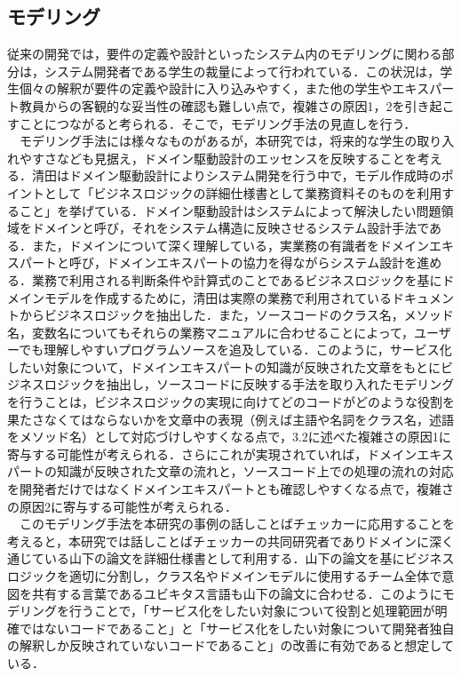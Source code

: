 \documentclass[12pt, a4paper]{jreport}
\begin{document}
\subsection{モデリング}
従来の開発では，要件の定義や設計といったシステム内のモデリングに関わる部分は，システム開発者である学生の裁量によって行われている．この状況は，学生個々の解釈が要件の定義や設計に入り込みやすく，また他の学生やエキスパート教員からの客観的な妥当性の確認も難しい点で，複雑さの原因1，2を引き起こすことにつながると考られる．そこで，モデリング手法の見直しを行う．
\\　モデリング手法には様々なものがあるが，本研究では，将来的な学生の取り入れやすさなども見据え，ドメイン駆動設計のエッセンスを反映することを考える．清田\cite{Domein}はドメイン駆動設計によりシステム開発を行う中で，モデル作成時のポイントとして「ビジネスロジックの詳細仕様書として業務資料そのものを利用すること」を挙げている．ドメイン駆動設計はシステムによって解決したい問題領域をドメインと呼び，それをシステム構造に反映させるシステム設計手法である．また，ドメインについて深く理解している，実業務の有識者をドメインエキスパートと呼び，ドメインエキスパートの協力を得ながらシステム設計を進める．業務で利用される判断条件や計算式のことであるビジネスロジックを基にドメインモデルを作成するために，清田は実際の業務で利用されているドキュメントからビジネスロジックを抽出した．また，ソースコードのクラス名，メソッド名，変数名についてもそれらの業務マニュアルに合わせることによって，ユーザーでも理解しやすいプログラムソースを追及している．このように，サービス化したい対象について，ドメインエキスパートの知識が反映された文章をもとにビジネスロジックを抽出し，ソースコードに反映する手法を取り入れたモデリングを行うことは，ビジネスロジックの実現に向けてどのコードがどのような役割を果たさなくてはならないかを文章中の表現（例えば主語や名詞をクラス名，述語をメソッド名）として対応づけしやすくなる点で，3.2に述べた複雑さの原因1に寄与する可能性が考えられる．さらにこれが実現されていれば，ドメインエキスパートの知識が反映された文章の流れと，ソースコード上での処理の流れの対応を開発者だけではなくドメインエキスパートとも確認しやすくなる点で，複雑さの原因2に寄与する可能性が考えられる．
\\　このモデリング手法を本研究の事例の話しことばチェッカーに応用することを考えると，本研究では話しことばチェッカーの共同研究者でありドメインに深く通じている山下の論文\cite{Yamashita}を詳細仕様書として利用する．山下の論文を基にビジネスロジックを適切に分割し，クラス名やドメインモデルに使用するチーム全体で意図を共有する言葉であるユビキタス言語も山下の論文に合わせる．このようにモデリングを行うことで，「サービス化をしたい対象について役割と処理範囲が明確ではないコードであること」と「サービス化をしたい対象について開発者独自の解釈しか反映されていないコードであること」の改善に有効であると想定している．
\end{document}
